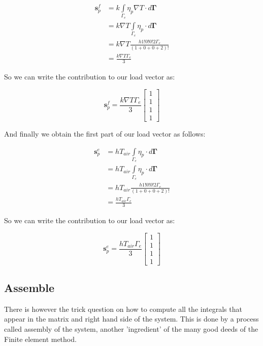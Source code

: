 \documentclass[12pt]{article}
\begin{document}
\begin{align*}
 \mathbf{s}_p^f &= k \int\limits_{\Gamma_{e}}{\eta_p\nabla T} \cdot d \mathbf{\Gamma} \\
 &= k \nabla T \int\limits_{\Gamma_{e}}{\eta_p} \cdot d \mathbf{\Gamma} \\
 &= k \nabla T \frac{h 1!0!0!2\Gamma_e}{(1+0+0+2)!} \\
 &= \frac{k\nabla T\Gamma_e}{3}
\end{align*}

So we can write the contribution to our load vector as:

\begin{equation}
\mathbf{s}_p^f = \frac{k\nabla T\Gamma_e}{3}
\begin{bmatrix} 1 \\ 1 \\ 1 \\ 1 
\end{bmatrix}
\end{equation}

And finally we obtain the first part of our load vector as follows:

\begin{align*}
 \mathbf{s}_p^e &= hT_{air} \int\limits_{\Gamma_{e}}{\eta_p} \cdot d \mathbf{\Gamma} \\
 &= hT_{air} \int\limits_{\Gamma_{e}}{\eta_p} \cdot d \mathbf{\Gamma} \\
 &= hT_{air} \frac{h 1!0!0!2\Gamma_e}{(1+0+0+2)!} \\
 &= \frac{hT_{air}\Gamma_e}{3}
\end{align*}

So we can write the contribution to our load vector as:

\begin{equation}
\mathbf{s}_p^e = \frac{hT_{air}\Gamma_e}{3}
\begin{bmatrix} 1 \\ 1 \\ 1 \\ 1 
\end{bmatrix}
\end{equation}

\subsection{Assemble}

There is however the trick question on how to compute all the integrals that appear in the matrix and right hand side of the
system. This is done by a process called assembly of the system, another 'ingredient' of the many good deeds of the Finite element method. \cite{Sayas}
\end{document}
